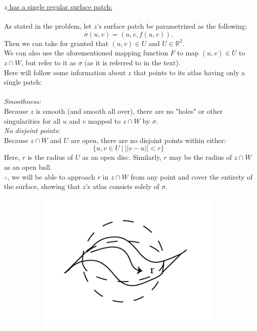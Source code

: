 \documentclass[12pt]{article}
\begin{document}
\noindent
\underline{$z$ has a single regular surface patch:}\\\\
As stated in the problem, let $z$'s surface patch be parametrized as the following:
$$
\sigma (u,v) = (u,v,f(u,v)).
$$
Then we can take for granted that $(u,v) \in U$ and $U \in \mathbb{R}^2$.\\
\indent
We can also use the aforementioned mapping function $F$ to map $(u,v) \in U$ to $z \cap W$, but refer to it as $\sigma$ (as it is referred to in the text).\\
\clearpage
Here will follow some information about $z$ that points to its atlas having only a single patch:\\\\
\indent
\emph{Smoothness:}\\
\indent
Because $z$ is smooth (and smooth all over), there are no "holes" or other singularities for all $u$ and $v$ mapped to $z \cap W$ by $\sigma$.\\

\emph{No disjoint points:}\\
\indent
Because $z \cap W$ and $U$ are open, there are no disjoint points within either:
$$
\lbrace u,v \in U \ | \ ||v-u|| < r \rbrace
$$
\indent
Here, $r$ is the radius of $U$ as an open disc. Similarly, $r$ may be the radius of $z \cap W$ as an open ball.\\

$\therefore$, we will be able to approach $r$ in $z \cap W$ from any point and cover the entirety of the surface, showing that $z$'s atlas consists solely of $\sigma$.
\begin{figure}[h!]
  \centering
      \begin{subfigure}[b]{0.5\linewidth}
    \includegraphics[width=\linewidth]{./assets/4-2-1/approaching-r.png}
  \end{subfigure}
  \end{figure}
  \\
\end{document}
